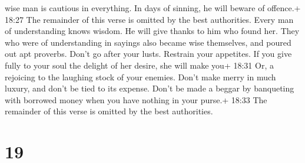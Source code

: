 wise man is cautious in everything. In days of sinning, he will beware
of offence.+ 18:27 The remainder of this verse is omitted by the best
authorities.  Every man of understanding knows wisdom. He
will give thanks to him who found her.  They who were of
understanding in sayings also became wise themselves, and poured out apt
proverbs.  Don't go after your lusts. Restrain your
appetites.  If you give fully to your soul the delight of
her desire, she will make you+ 18:31 Or, a rejoicing to the laughing
stock of your enemies.  Don't make merry in much luxury,
and don't be tied to its expense.  Don't be made a beggar
by banqueting with borrowed money when you have nothing in your purse.+
18:33 The remainder of this verse is omitted by the best authorities.

\hypertarget{section-15}{%
\section{19}\label{section-15}}

